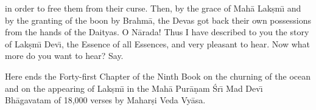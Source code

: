 in order to free them from their curse. Then, by the grace of Mah\=a Lak\d{s}m\={\i} and by the granting of the boon by Brahm\=a, the Devas got back their own possessions from the hands of the Daityas. O N\=arada! Thus I have described to you the story of Lak\d{s}m\={\i} Dev\={\i}, the Essence of all Essences, and very pleasant to hear. Now what more do you want to hear? Say.

Here ends the Forty-first Chapter of the Ninth Book on the churning of the ocean and on the appearing of Lak\d{s}m\={\i} in the Mah\=a Pur\=a\d{n}am \'Sr\={\i} Mad Dev\={\i} Bh\=agavatam of 18,000 verses by Mahar\d{s}i Veda Vy\=asa.



